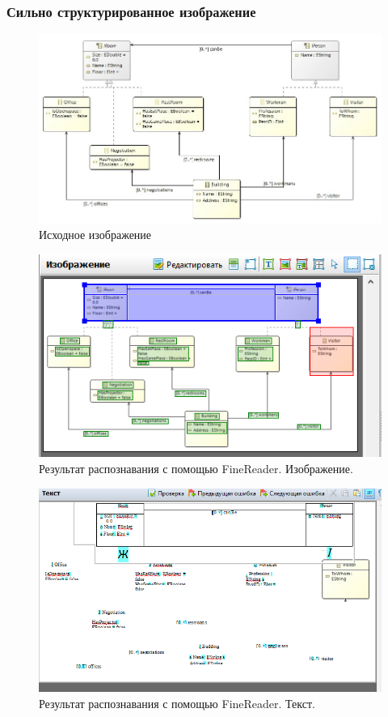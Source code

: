 		\subsubsection{Сильно структурированное изображение}
			\begin{figure}[h]
				\centering
				\includegraphics[width=0.7\linewidth]{images/uml}
				\caption{Исходное изображение}
				\label{fig:uml}
			\end{figure}
			\begin{figure}[h]
				\centering
				\includegraphics[width=0.7\linewidth]{images/uml-finereader}
				\caption{Результат распознавания с помощью FineReader. Изображение.}
				\label{fig:uml-finereader}
			\end{figure}
			\begin{figure}[h]
				\centering
				\includegraphics[width=0.7\linewidth]{images/uml-finereader2}
				\caption{Результат распознавания с помощью FineReader. Текст.}
				\label{fig:uml-finereader2}
			\end{figure}
